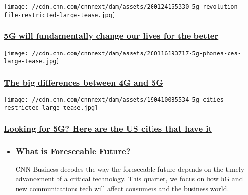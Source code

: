 \href{/2020/01/27/perspectives/5g-revolution/index.html}{}

\texttt{[image: //cdn.cnn.com/cnnnext/dam/assets/200124165330-5g-revolution-file-restricted-large-tease.jpg]}

\hypertarget{5g-will-fundamentally-change-our-lives-for-the-better}{%
\subsubsection{\texorpdfstring{\href{/2020/01/27/perspectives/5g-revolution/index.html}{5G
will fundamentally change our lives for the
better}}{5G will fundamentally change our lives for the better}}\label{5g-will-fundamentally-change-our-lives-for-the-better}}

\href{/2020/01/17/tech/5g-technical-explainer/index.html}{}

\texttt{[image: //cdn.cnn.com/cnnnext/dam/assets/200116193717-5g-phones-ces-large-tease.jpg]}

\hypertarget{the-big-differences-between-4g-and-5g}{%
\subsubsection{\texorpdfstring{\href{/2020/01/17/tech/5g-technical-explainer/index.html}{The
big differences between 4G and
5G}}{The big differences between 4G and 5G}}\label{the-big-differences-between-4g-and-5g}}

\href{/2019/04/09/tech/5g-network-us-cities/index.html}{}

\texttt{[image: //cdn.cnn.com/cnnnext/dam/assets/190410085534-5g-cities-restricted-large-tease.jpg]}

\hypertarget{looking-for-5g-here-are-the-us-cities-that-have-it}{%
\subsubsection{\texorpdfstring{\href{/2019/04/09/tech/5g-network-us-cities/index.html}{Looking
for 5G? Here are the US cities that have
it}}{Looking for 5G? Here are the US cities that have it}}\label{looking-for-5g-here-are-the-us-cities-that-have-it}}

\begin{itemize}
\item
  \hypertarget{what-is-foreseeable-future}{%
  \subsubsection{What is Foreseeable
  Future?}\label{what-is-foreseeable-future}}

  CNN Business decodes the way the foreseeable future depends on the
  timely advancement of a critical technology. This quarter, we focus on
  how 5G and new communications tech will affect consumers and the
  business world.
\end{itemize}

